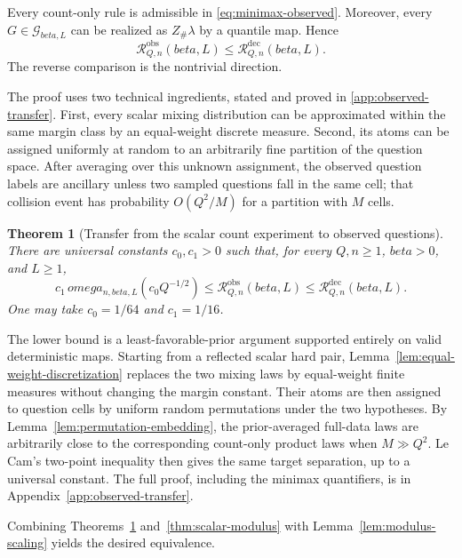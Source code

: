 \documentclass[11pt]{article}
\def\beta{beta}%
\def\omega{omega}%
\newtheorem{theorem}{Theorem}[section]
\newcommand{\calG}{\mathcal G}
\newcommand{\calR}{\mathcal R}
\newcommand\eed[1]{{\color{green!45!black} #1}}
\begin{document}
Every count-only rule is admissible in \eqref{eq:minimax-observed}.  Moreover, every $G\in\calG_{\beta,L}$ can be realized as $Z_\#\lambda$ by a quantile map.  Hence
\begin{equation}
\label{eq:obs-le-count}
\calR^{\mathrm{obs}}_{Q,n}(\beta,L)
\le
\calR^{\mathrm{dec}}_{Q,n}(\beta,L).
\end{equation}
The reverse comparison is the nontrivial direction.

\eed{The proof uses two technical ingredients, stated and proved in \cref{app:observed-transfer}.  First, every scalar mixing distribution can be approximated within the same margin class by an equal-weight discrete measure.  Second, its atoms can be assigned uniformly at random to an arbitrarily fine partition of the question space.  After averaging over this unknown assignment, the observed question labels are ancillary unless two sampled questions fall in the same cell; that collision event has probability $O(Q^2/M)$ for a partition with $M$ cells.}

\begin{theorem}[Transfer from the scalar count experiment to observed questions]
\label{thm:observed-transfer}
There are universal constants $c_0,c_1>0$ such that, for every $Q,n\ge1$, $\beta>0$, and $L\ge1$,
\begin{equation}
\label{eq:observed-transfer}
 c_1\,\omega_{n,\beta,L}(c_0Q^{-1/2})
\le
\calR^{\mathrm{obs}}_{Q,n}(\beta,L)
\le
\calR^{\mathrm{dec}}_{Q,n}(\beta,L).
\end{equation}
One may take $c_0=1/64$ and $c_1=1/16$.
\end{theorem}

The lower bound is a least-favorable-prior argument supported entirely on valid deterministic maps.  Starting from a reflected scalar hard pair, Lemma~\ref{lem:equal-weight-discretization} replaces the two mixing laws by equal-weight finite measures without changing the margin constant.  Their atoms are then assigned to question cells by uniform random permutations under the two hypotheses.  By Lemma~\ref{lem:permutation-embedding}, the prior-averaged full-data laws are arbitrarily close to the corresponding count-only product laws when $M\gg Q^2$.  Le Cam's two-point inequality then gives the same target separation, up to a universal constant.  The full proof, including the minimax quantifiers, is in Appendix~\ref{app:observed-transfer}.

Combining Theorems~\ref{thm:observed-transfer} and~\ref{thm:scalar-modulus} with Lemma~\ref{lem:modulus-scaling} yields the desired equivalence.
\end{document}
